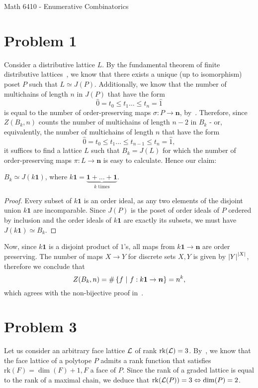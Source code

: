 \documentclass[11pt]{article}
\begin{document}
\allowdisplaybreaks

%
{Math 6410 - Enumerative Combinatorics}

\section*{Problem 1}
Consider a distributive lattice $L$. By the fundamental theorem of finite
distributive lattices~\cite[Theorem 3.4.1]{Stan12}, we know that there exists
a unique (up to isomorphism) poset $P$ such that $L \simeq J(P)$.
Additionally, we know that the number of multichains of length $n$ in $J(P)$
that have the form
\[
    \hat{0} = t_0 \leq t_1 \dots \leq t_n = \hat{1}
\]
is equal to the number of order-preserving maps $\sigma : P \to \bm{n}$,
by~\cite[Proposition 3.5.1]{Stan12}. Therefore, since $Z(B_k, n)$ counts the
number of multichains of length $n - 2$ in $B_k$ - or, equivalently, the number
of multichains of length $ n $ that have the form
\[
    \hat{0} = t_0 \leq t_1 \dots \leq t_{n-1} \leq t_n = \hat{1},
\]
it suffices to find a lattice $L$ such that $B_k = J(L)$ for which the number
of order-preserving maps $\pi: L \to \bm{n}$ is easy to calculate. Hence our
claim:
\begin{claim}
    $B_k \simeq J(k \bm{1})$, where $k \bm{1} =
    \underbrace{\bm{1} + \dots + \bm{1}}_{k \text{ times}}$.
\end{claim}
\begin{proof}
    Every subset of $k \bm{1}$ is an order ideal, as any two elements of
    the disjoint union $k \bm{1}$ are incomparable. Since $J(P)$ is the poset
    of order ideals of $P$ ordered by inclusion and the order ideals of $k
    \bm{1}$ are exactly its subsets, we must have
    $J(k \bm{1}) \simeq B_k$.
\end{proof}
Now, since $k \bm{1}$ is a disjoint product of $1$'s, all maps from $k \bm{1}
\to \bm{n}$ are order preserving. The number of maps $X \to Y$ for discrete sets
$X, Y$ is given by $\left| Y \right|^{\left| X \right|}$, therefore we conclude that
\[
    Z(B_k, n) = \#\left\{ f \ \middle| \  f : k\bm{1} \to \bm{n} \right\} = n^k,
\]
which agrees with the non-bijective proof in~\cite[Example 3.12.2]{Stan12}.

\section*{Problem 3}
Let us consider an arbitrary face lattice $\mathcal{L}$ of rank $\mathrm{rk}(\mathcal{L}) = 3$.
By~\cite[Theorem 2.7]{Zieg95}, we know that the face lattice of a polytope $P$
admits a rank function that satisfies $\mathrm{rk}(F) = \dim(F) + 1, F$ a face
of $P$. Since the rank of a graded lattice is equal to the rank of a maximal
chain, we deduce that $\mathrm{rk}(\mathcal{L}(P)) = 3 \Leftrightarrow \dim(P) = 2$.
\end{document}
